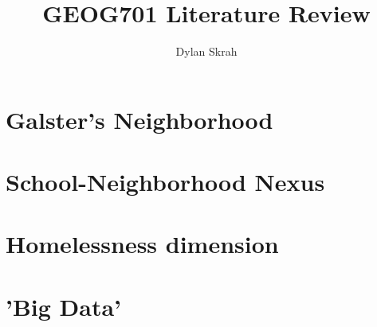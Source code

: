 \documentclass{article}
\begin{document}
\title{GEOG701 Literature Review}
\author{Dylan Skrah}

\maketitle
\tableofcontents

\section{Galster's Neighborhood}


\section{School-Neighborhood Nexus}


\section{Homelessness dimension}


\section{'Big Data'}

\end{document}
